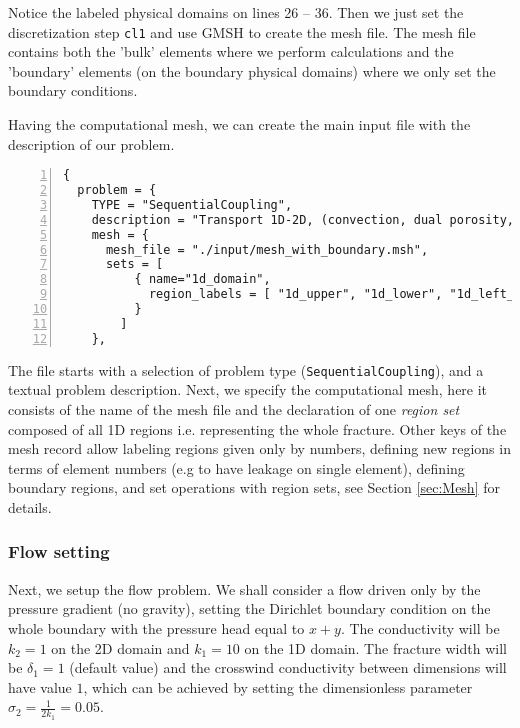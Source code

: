 \documentclass[12pt,a4paper]{report}
\begin{document}
Notice the labeled physical domains on lines 26 -- 36. Then we just set the discretization step \verb'cl1' and use GMSH to create the mesh file.
The mesh file contains both the 'bulk' elements where we perform calculations and the 'boundary' elements (on the boundary physical domains) where we only set the boundary conditions.

\pagebreak
Having the computational mesh, we can create the main input file with the description of our problem. 
\begin{Verbatim}[numbers=left]
{
  problem = {
    TYPE = "SequentialCoupling", 
    description = "Transport 1D-2D, (convection, dual porosity, sorption)", 
    mesh = {
      mesh_file = "./input/mesh_with_boundary.msh",
      sets = [
          { name="1d_domain", 
            region_labels = [ "1d_upper", "1d_lower", "1d_left_branch" ]
          }
        ]
    },  
\end{Verbatim}
The file starts with a selection of problem type (\verb'SequentialCoupling'), and a textual problem description.
Next, we specify the computational mesh, here it consists of the name of the mesh file and the declaration of one {\it region set} 
composed of all 1D regions i.e. representing the whole fracture. Other keys of the mesh record allow labeling regions given only by numbers, 
defining new regions in terms of element numbers (e.g to have leakage on single element), 
defining boundary regions, and set operations with region sets, see Section \ref{sec:Mesh} for details.

\subsubsection{Flow setting}
Next, we setup the flow problem. We shall consider a flow driven only by the pressure gradient (no gravity),
setting the Dirichlet boundary condition on the whole boundary with the pressure head equal to $x+y$. 
The conductivity will be $k_2=1$ on the 2D domain and $k_1=10$ on the 1D domain.
The fracture width will be $\delta_1=1$ (default value) and the crosswind conductivity between dimensions will have value $1$, which can be achieved by setting the dimensionless parameter $\sigma_2 = \frac{1}{2k_1}=0.05$. 
\end{document}

